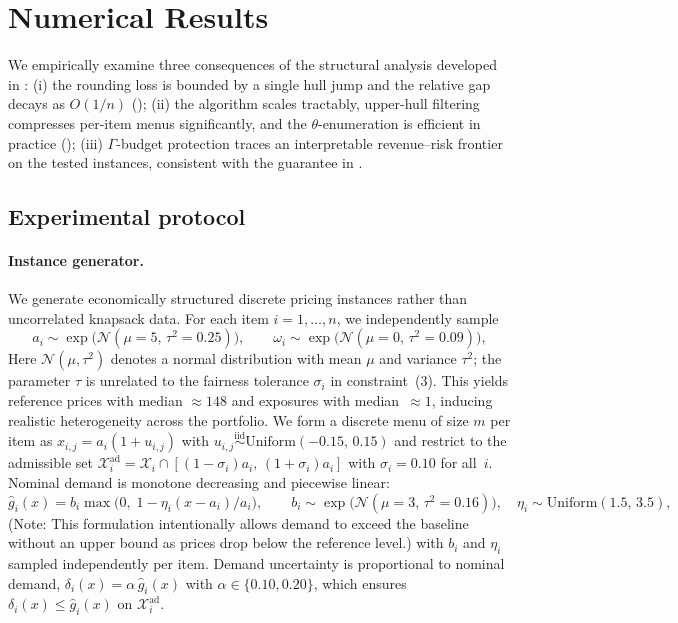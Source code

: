 \documentclass[11pt, a4paper]{article}
\theoremstyle{plain}
\theoremstyle{definition}
\theoremstyle{remark}
\begin{document}
\section{Numerical Results}\label{sec:numerics}

We empirically examine three consequences of the structural analysis developed in
:
(i) the rounding loss is bounded by a single hull jump and the relative gap decays as \(O(1/n)\)
    ();
(ii) the algorithm scales tractably, upper-hull filtering compresses per-item menus significantly,
    and the $\theta$-enumeration is efficient in practice
    ();
(iii) $\Gamma$-budget protection traces an interpretable revenue--risk frontier on the tested instances, consistent with the guarantee in .

\subsection{Experimental protocol}\label{subsec:numerics_protocol}

\paragraph{Instance generator.}
We generate economically structured discrete pricing instances rather than uncorrelated knapsack
data. For each item $i=1,\dots,n$, we independently sample
\[
a_i\sim \exp\!\big(\mathcal N(\mu{=}5,\,\tau^2{=}0.25)\big),
\qquad
\omega_i\sim \exp\!\big(\mathcal N(\mu{=}0,\,\tau^2{=}0.09)\big),
\]
Here $\mathcal N(\mu,\tau^2)$ denotes a normal distribution with mean $\mu$ and variance $\tau^2$; the parameter $\tau$ is unrelated to the fairness tolerance $\sigma_i$ in constraint~(3). This yields reference prices with median $\approx 148$ and exposures with median~$\approx 1$, inducing
realistic heterogeneity across the portfolio. We form a discrete menu of size $m$ per item as
$x_{i,j}=a_i(1+u_{i,j})$ with
$u_{i,j}\stackrel{\mathrm{iid}}{\sim}\mathrm{Uniform}(-0.15,\,0.15)$ and restrict to the
admissible set
$\mathcal X_i^{\mathrm{ad}}=\mathcal X_i\cap[(1-\sigma_i)a_i,\,(1+\sigma_i)a_i]$ with
$\sigma_i=0.10$ for all~$i$.
Nominal demand is monotone decreasing and piecewise linear:
\[
\hat g_i(x)=b_i\max\!\big(0,\;1-\eta_i(x-a_i)/a_i\big),
\qquad
b_i\sim\exp\!\big(\mathcal N(\mu{=}3,\,\tau^2{=}0.16)\big),\quad
\eta_i\sim\mathrm{Uniform}(1.5,\,3.5),
\]
\noindent (Note: This formulation intentionally allows demand to exceed the baseline without an upper bound as prices drop below the reference level.)
with $b_i$ and $\eta_i$ sampled independently per item.
Demand uncertainty is proportional to nominal demand,
$\delta_i(x)=\alpha\,\hat g_i(x)$ with $\alpha\in\{0.10,0.20\}$,
which ensures $\delta_i(x)\le\hat g_i(x)$ on $\mathcal X_i^{\mathrm{ad}}$.
\end{document}
